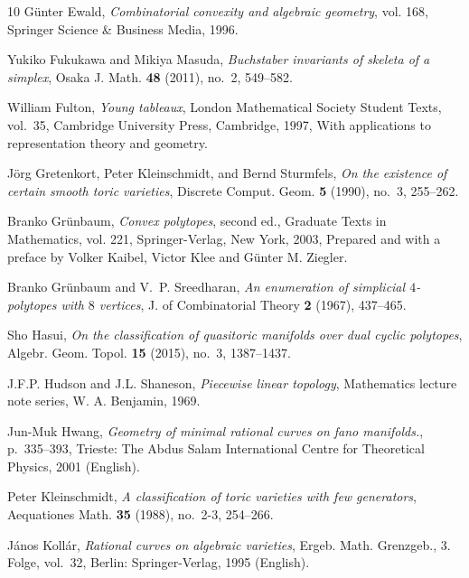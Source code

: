 \documentclass[11pt]{amsart}
\theoremstyle{plain}
\numberwithin{equation}{section}
\theoremstyle{definition}
\begin{document}
\begin{thebibliography}{10}
	G{\"u}nter Ewald, \emph{Combinatorial convexity and algebraic geometry}, vol.
	168, Springer Science \& Business Media, 1996.
	
	Yukiko Fukukawa and Mikiya Masuda, \emph{Buchstaber invariants of skeleta of a
		simplex}, Osaka J. Math. \textbf{48} (2011), no.~2, 549--582. 
	
	William Fulton, \emph{Young tableaux}, London Mathematical Society Student
	Texts, vol.~35, Cambridge University Press, Cambridge, 1997, With
	applications to representation theory and geometry. 
	
	J\"org Gretenkort, Peter Kleinschmidt, and Bernd Sturmfels, \emph{On the
		existence of certain smooth toric varieties}, Discrete Comput. Geom.
	\textbf{5} (1990), no.~3, 255--262. 
	
	Branko Gr\"{u}nbaum, \emph{Convex polytopes}, second ed., Graduate Texts in
	Mathematics, vol. 221, Springer-Verlag, New York, 2003, Prepared and with a
	preface by Volker Kaibel, Victor Klee and G\"unter M. Ziegler. 
	
	Branko Gr\"{u}nbaum and V.~P. Sreedharan, \emph{An enumeration of simplicial
		{$4$}-polytopes with {$8$} vertices}, J. of Combinatorial Theory \textbf{2}
	(1967), 437--465. 
	
	Sho Hasui, \emph{On the classification of quasitoric manifolds over dual cyclic
		polytopes}, Algebr. Geom. Topol. \textbf{15} (2015), no.~3, 1387--1437.
	
	J.F.P. Hudson and J.L. Shaneson, \emph{Piecewise linear topology}, Mathematics
	lecture note series, W. A. Benjamin, 1969.
	
	Jun-Muk Hwang, \emph{Geometry of minimal rational curves on fano manifolds.},
	p.~335–393, Trieste: The Abdus Salam International Centre for Theoretical
	Physics, 2001 (English).
	
	Peter Kleinschmidt, \emph{A classification of toric varieties with few
		generators}, Aequationes Math. \textbf{35} (1988), no.~2-3, 254--266.
	
	János Kollár, \emph{Rational curves on algebraic varieties}, Ergeb. Math.
	Grenzgeb., 3. Folge, vol.~32, Berlin: Springer-Verlag, 1995 (English).
	

\end{thebibliography}
\end{document}
